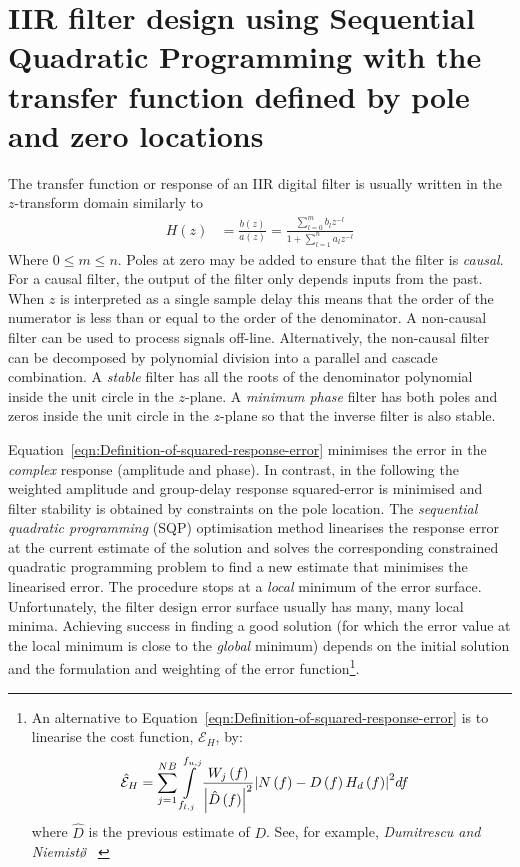 \documentclass[a4paper,twoside,10pt,english]{report}
\begin{document}
\chapter{\label{sec:Constrained-Optimisation-of-IIR-by-Quadratic-Programming-Pole-Zero-Location}IIR filter design using Sequential Quadratic Programming with the transfer function defined by pole and zero locations}
The transfer function or response of an IIR digital filter is usually written
in the $z$-transform domain similarly to
\begin{align}
H\left(z\right) &= \frac{b\left(z\right)}{a\left(z\right)} = 
\frac{\sum^{m}_{l=0}b_{l}z^{-l}}{1+\sum^{n}_{l=1}a_{l}z^{-l}}
\label{eqn:Transfer-function-H}
\end{align}
Where $0 \le m \le n$. Poles at zero may be added to ensure that the filter is
 \emph{causal}. For a causal filter, the output of the
filter only depends inputs from the past. When $z$ is interpreted as a single 
sample delay this means that the order of the numerator is less than or equal
to the order of the denominator. A non-causal filter can be used to process 
signals off-line. Alternatively, the non-causal filter can be decomposed by
polynomial division into a parallel and cascade combination. A \emph{stable} 
filter has all the roots of the denominator polynomial inside the unit circle
in the $z$-plane. A \emph{minimum phase} filter has both poles and zeros inside
the unit circle in the $z$-plane so that the inverse filter is also stable.

Equation~\ref{eqn:Definition-of-squared-response-error} minimises the error in
the \emph{complex} response (amplitude and phase). In contrast, in the following
the weighted amplitude and group-delay response squared-error is minimised and
filter stability is obtained by constraints on the pole location. The 
\emph{sequential quadratic programming} (SQP) optimisation method
linearises the response error at the current estimate of the solution
and solves the corresponding constrained quadratic programming problem to 
find a new estimate that minimises the linearised error. The procedure stops
at a \emph{local} minimum of the error surface. Unfortunately, the filter 
design error surface usually has many, many local minima. Achieving success in
finding a good solution (for which the error value at the local minimum is 
close to the \emph{global} minimum) depends on the initial solution and the 
formulation and weighting of the error function\footnote{An 
alternative to Equation~\ref{eqn:Definition-of-squared-response-error} is to
linearise the cost function, $\mathcal{E}_{H}$, by:
\begin{align*}
\hat{\mathcal{E}}_{H} &= \sum_{j=1}^{NB}\intop_{f_{l,j}}^{f_{u,j}}
\frac{W_{j}\left(f\right)}{\left| \hat{D}\left(f\right) \right|^{2}}
{\left|N\left(f\right)-D\left(f\right)H_{d}\left(f\right)\right|^{2}}df
\end{align*}
where $\hat{D}$ is the previous estimate of $D$. See, for example,
\emph{Dumitrescu and Niemist\"\o} 
~\cite{DumitrescuNiemisto_IIRFilterPositiveRealness}}.
\end{document}
